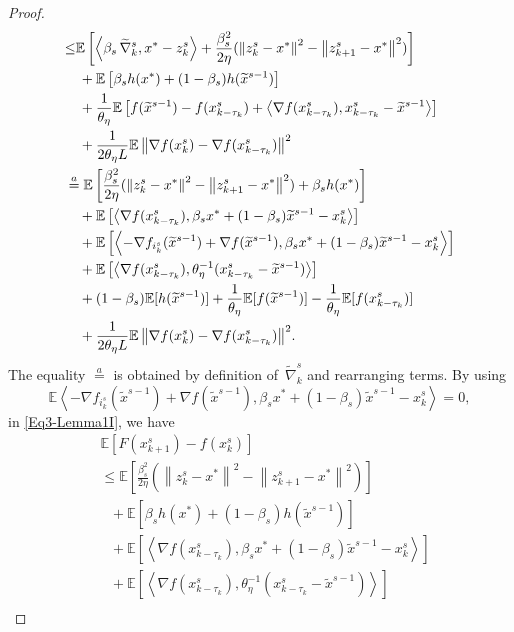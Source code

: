 \documentclass[conference]{IEEEtran}
\newcommand*{\E}{\mathbb{E}}
\newcommand*{\VRG}{\,\widetilde{\nabla}_k^s}
\newcommand{\norm}[1]{\left\lVert#1\right\rVert}
\newcommand{\Iprod}[2]{\left\langle #1,#2\right\rangle}
\theoremstyle{definition}
\theoremstyle{remark}
\begin{document}
\begin{proof}
\begin{gather}
\begin{split}
&{\leq}\E\left[\Iprod{\beta_s\VRG}{x^* - z_{k}^s}+{\frac{\beta_s^2}{2\eta}}(\norm{z_{k}^s-x^*}^2-\norm{z_{k+1}^s-x^*}^2)\right]\\
&~~~+\E\left[\beta_s h(x^*)+(1-\beta_s) h(\widetilde{x}^{s-1})\right]\\
&~~~+\frac{1}{\theta_{\eta}}\E\left[f(\widetilde{x}^{s-1})-f(x_{k-\tau_k}^s)+\Iprod{\nabla f(x_{k-\tau_k}^s)}{x_{k-\tau_k}^s-\widetilde{x}^{s-1}}\right]\\
&~~~+{\frac{1}{2 \theta_{\eta} L} \E\norm{\nabla f(x_{k}^s)-\nabla f(x_{k-\tau_k}^s)}^2}\\
& \stackrel{a}{=} \E\left[{\frac{ \beta_s^2}{2\eta}}(\norm{z_{k}^s-x^*}^2-\norm{z_{k+1}^s-x^*}^2)+\beta_sh(x^*)\right]\\
&~~~+\E\left[\Iprod{\nabla f(x_{k-\tau_k}^s)}{\beta_sx^*+(1-\beta_s)\widetilde{x}^{s-1}-{x}^{s}_{k}}\right]\\
&~~~+\E\left[\Iprod{-\nabla f_{i_k^s}(\widetilde{x}^{s-1})+\nabla f(\widetilde{x}^{s-1})}{\beta_sx^*+(1-\beta_s)\widetilde{x}^{s-1}-x_{k}^{s}}\right]\\
&~~~+\E\left[\Iprod{\nabla f(x_{k-\tau_k}^s)}{\theta_{\eta}^{-1}(x_{k-\tau_k}^s-\widetilde{x}^{s-1})}\right]\\
&~~~+(1-\beta_s) \E[h(\widetilde{x}^{s-1})]+\frac{1}{\theta_{\eta}}\E[f(\widetilde{x}^{s-1})]-\frac{1}{\theta_{\eta}}\E[f({x}^{s}_{k-\tau_k})]\\
&~~~+{\frac{1}{2 \theta_{\eta} L} \E\norm{\nabla f(x_{k}^s)-\nabla f(x_{k-\tau_k}^s)}^2}.
\end{split}
\raisetag{18pt}
\end{gather}
The equality $\stackrel{a}{=}$ is obtained by definition of $\VRG$ and rearranging terms. By using    
\[
\E\Iprod{-\nabla f_{i_k^s}(\widetilde{x}^{s-1})+\nabla f(\widetilde{x}^{s-1})}{\beta_sx^*+(1-\beta_s)\widetilde{x}^{s-1}-x_{k}^{s}}=0,
\]
in \eqref{Eq3-Lemma1I}, we have
\begin{equation}\label{Eq3-Lemma1}
\begin{split}
&\E\left[F(x_{k+1}^s) -f(x_{k}^s)\right]\\
&\leq\E\left[{\frac{ \beta_s^2}{2\eta}}(\norm{z_{k}^s-x^*}^2-\norm{z_{k+1}^s-x^*}^2)\right]\\
&~~~+\E\left[\beta_sh(x^*)+(1-\beta_s) h(\widetilde{x}^{s-1})\right]\\
&~~~+\E\left[\Iprod{\nabla f(x_{k-\tau_k}^s)}{\beta_sx^*+(1-\beta_s)\widetilde{x}^{s-1}-{x}^{s}_{k}}\right]\\
&~~~+\E\left[\Iprod{\nabla f(x_{k-\tau_k}^s)}{\theta_{\eta}^{-1}(x_{k-\tau_k}^s-\widetilde{x}^{s-1})}\right]\\

\end{split}
\end{equation}
\end{proof}
\end{document}
